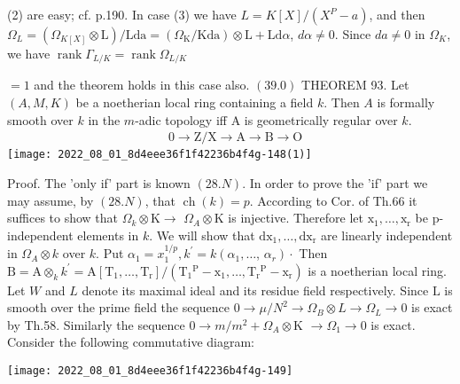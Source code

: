 (2) are easy; cf. p.190. In case (3) we have $L=K[X] /\left(X^{P}-a\right)$, and then $\Omega_{L}=\left(\Omega_{K[X]} \otimes \mathrm{L}\right) / \mathrm{Lda}=\left(\Omega_{\mathrm{K}} / \mathrm{Kda}\right) \otimes \mathrm{L}+\mathrm{Ld} \alpha$, $d \alpha \neq 0$. Since $d a \neq 0$ in $\Omega_{K}$, we have $\operatorname{rank} \Gamma_{L / K}=\operatorname{rank} \Omega_{L / K}$

$=1$ and the theorem holds in this case also. $(39.0)$ THEOREM 93. Let $(A, M, K)$ be a noetherian local ring containing a field $k$. Then $A$ is formally smooth over $k$ in the $m$-adic topology iff A is geometrically regular over $k$.
$$
\begin{aligned}
& 0 \rightarrow \mathrm{Z} / \mathrm{X} \rightarrow \mathrm{A} \rightarrow \mathrm{B} \rightarrow \mathrm{O}
\end{aligned}
$$
\texttt{[image: 2022\_08\_01\_8d4eee36f1f42236b4f4g-148(1)]}

Proof. The 'only if' part is known $(28 . N)$. In order to prove the 'if' part we may assume, by $(28 . N)$, that $\operatorname{ch}(k)=p$. According to Cor. of Th.66 it suffices to show that $\Omega_{k} \otimes \mathrm{K} \rightarrow$ $\Omega_{A} \otimes \mathrm{K}$ is injective. Therefore let $\mathrm{x}_{1}, \ldots, \mathrm{x}_{\mathrm{r}}$ be p-independent elements in $k$. We will show that $\mathrm{dx}_{1}, \ldots, \mathrm{d} \mathrm{x}_{\mathrm{r}}$ are linearly independent in $\Omega_{A} \otimes k$ over $k$. Put $\alpha_{1}=x_{1}^{1 / p}, k^{\prime}=k\left(\alpha_{1}, \ldots\right.$, $\left.\alpha_{r}\right) \cdot$ Then $\mathrm{B}=\mathrm{A} \otimes_{k} k^{\prime}=\mathrm{A}\left[\mathrm{T}_{1}, \ldots, \mathrm{T}_{\mathrm{r}}\right] /\left(\mathrm{T}_{1}{ }^{\mathrm{P}}-\mathrm{x}_{1}, \ldots, \mathrm{T}_{\mathrm{r}}{ }^{\mathrm{P}}-\mathrm{x}_{\mathrm{r}}\right)$ is a noetherian local ring. Let $W$ and $L$ denote its maximal ideal and its residue field respectively. Since $\mathrm{L}$ is smooth over the prime field the sequence $0 \rightarrow \mu / N^{2} \rightarrow \Omega_{B} \otimes L \rightarrow \Omega_{L} \rightarrow 0$ is exact by Th.58. Similarly the sequence $0 \rightarrow m / m^{2}+\Omega_{A} \otimes \mathrm{K}$ $\rightarrow \Omega_{1} \rightarrow 0$ is exact. Consider the following commutative diagram:

\texttt{[image: 2022\_08\_01\_8d4eee36f1f42236b4f4g-149]}

